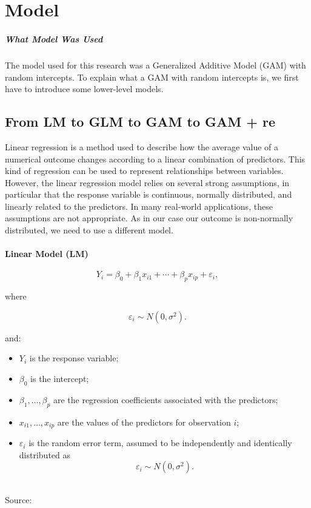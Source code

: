 \chapter{Model}
\paragraph{What Model Was Used}
The model used for this research was a Generalized Additive Model (GAM) with random intercepts.
To explain what a GAM with random intercepts is, we first have to introduce some lower-level models.\\
\section{From LM to GLM to GAM to GAM + re}
Linear regression is a method used to describe how the average 
value of a numerical outcome changes according to a linear 
combination of predictors.
This kind of regression can be used to represent relationships 
between variables.
However, the linear regression model relies on several strong assumptions, 
in particular that the response variable is continuous, 
normally distributed, and linearly related to the predictors. 
In many real-world applications, these assumptions are not appropriate. 
As in our case our outcome is non-normally distributed, we need
to use a different model.
\subsubsection{Linear Model (LM)}
\begin{equation}
Y_i = \beta_0 + \beta_1x_{i1} + \cdots + \beta_px_{ip} + \varepsilon_i,
\end{equation}

where

\begin{equation}
\varepsilon_i \sim N(0,\sigma^2).
\end{equation}

and:
\begin{itemize}
    \item $Y_i$ is the response variable;
    \item $\beta_0$ is the intercept;
    \item $\beta_1,\ldots,\beta_p$ are the regression coefficients associated with the predictors;
    \item $x_{i1},\ldots,x_{ip}$ are the values of the predictors for observation $i$;
    \item $\varepsilon_i$ is the random error term, assumed to be independently and identically distributed as
    \[
    \varepsilon_i \sim N(0,\sigma^2).
    \]
\end{itemize}\\
\small Source: \textcite[p.~37]{gelman2007book}

